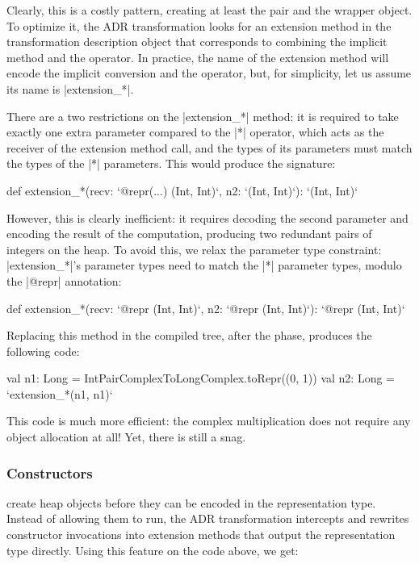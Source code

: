Clearly, this is a costly pattern, creating at least the pair and the wrapper object. To optimize it, the ADR transformation looks for an extension method in the transformation description object that corresponds to combining the implicit method and the operator. In practice, the name of the extension method will encode the implicit conversion and the operator, but, for simplicity, let us assume its name is |extension_*|.

There are a two restrictions on the |extension_*| method: it is required to take exactly one extra parameter compared to the |*| operator, which acts as the receiver of the extension method call, and the types of its parameters must match the types of the |*| parameters. This would produce the signature:

\begin{lstlisting-nobreak}
def extension_*(recv: `@repr(...) (Int, Int)`, n2: `(Int, Int)`): `(Int, Int)`
\end{lstlisting-nobreak}

However, this is clearly inefficient: it requires decoding the second parameter and encoding the result of the computation, producing two redundant pairs of integers on the heap. To avoid this, we relax the parameter type constraint: |extension_*|'s parameter types need to match the |*| parameter types, modulo the |@repr| annotation:

\begin{lstlisting-nobreak}
def extension_*(recv: `@repr (Int, Int)`,  n2: `@repr (Int, Int)`): `@repr (Int, Int)`
\end{lstlisting-nobreak}

Replacing this method in the compiled tree, after the \commit{} phase, produces the following code:

\begin{lstlisting-nobreak}
val n1: Long = IntPairComplexToLongComplex.toRepr((0, 1))
val n2: Long = `extension_*(n1, n1)`
\end{lstlisting-nobreak}

This code is much more efficient: the complex multiplication does not require any object allocation at all! Yet, there is still a snag.

\subsubsection{Constructors} create heap objects before they can be encoded in the representation type. Instead of allowing them to run, the ADR transformation intercepts and rewrites constructor invocations into extension methods that output the representation type directly. Using this feature on the code above, we get:

